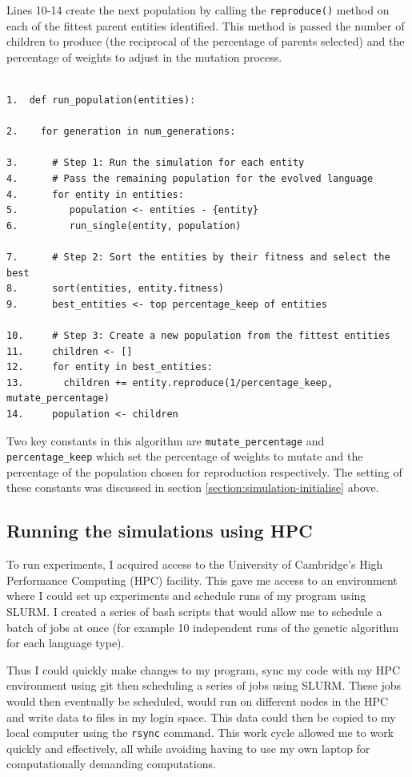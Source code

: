 \documentclass[12pt,a4paper,twoside,openright]{report}
\begin{document}
Lines 10-14 create the next population by calling the \texttt{reproduce()} method on each of the fittest parent entities identified. This method is passed the number of children to produce (the reciprocal of the percentage of parents selected) and the percentage of weights to adjust in the mutation process.

\begin{verbatim}

1.  def run_population(entities):

2.    for generation in num_generations:

3.      # Step 1: Run the simulation for each entity
4.      # Pass the remaining population for the evolved language
4.      for entity in entities:
5.         population <- entities - {entity}
6.         run_single(entity, population)
           
7.      # Step 2: Sort the entities by their fitness and select the best
8.      sort(entities, entity.fitness)
9.      best_entities <- top percentage_keep of entities

10.     # Step 3: Create a new population from the fittest entities
11.     children <- []
12.     for entity in best_entities:
13.       children += entity.reproduce(1/percentage_keep, mutate_percentage)
14.     population <- children

\end{verbatim}

Two key constants in this algorithm are \texttt{mutate\_percentage} and \texttt{percentage\_keep} which set the percentage of weights to mutate and the percentage of the population chosen for reproduction respectively. The setting of these constants was discussed in section \ref{section:simulation-initialise} above.

\subsection{Running the simulations using HPC}\label{section:running}

To run experiments, I acquired access to the University of Cambridge's High Performance Computing (HPC) facility. This gave me access to an environment where I could set up experiments and schedule runs of my program using SLURM. I created a series of bash scripts that would allow me to schedule a batch of jobs at once (for example 10 independent runs of the genetic algorithm for each language type).

Thus I could quickly make changes to my program, sync my code with my HPC environment using git then scheduling a series of jobs using SLURM. These jobs would then eventually be scheduled, would run on different nodes in the HPC and write data to files in my login space. This data could then be copied to my local computer using the \texttt{rsync} command. This work cycle allowed me to work quickly and effectively, all while avoiding having to use my own laptop for computationally demanding computations. 
\end{document}
